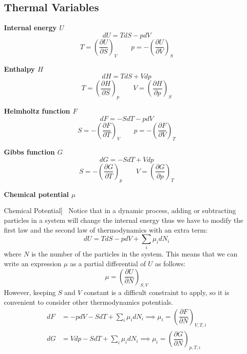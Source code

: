 \documentclass[UTF8]{book}
\newenvironment{theorem}[2][Theorem]{\begin{trivlist}
\item[\hskip \labelsep {\bfseries #1}\hskip \labelsep {\bfseries }]}{\end{trivlist}}
\begin{document}
\subsection{Thermal Variables}
\begin{itemize}
\item \textbf{Internal energy $U$}
$$dU=TdS-pdV$$
$$T=\left(\dfrac{\partial U}{\partial S}\right)_V \qquad p=-\left(\dfrac{\partial U}{\partial V}\right)_S$$
\item \textbf{Enthalpy $H$} \cite{schroeder1999introduction}
$$dH=TdS+Vdp$$
$$T=\left(\dfrac{\partial H}{\partial S}\right)_p \qquad V=\left(\dfrac{\partial H}{\partial p}\right)_S$$
\item \textbf{Helmholtz function $F$}
$$dF=-SdT-pdV$$
$$S=-\left(\dfrac{\partial F}{\partial T}\right)_V \qquad p=-\left(\dfrac{\partial F}{\partial V}\right)_T$$
\item \textbf{Gibbs function $G$}
$$dG=-SdT+Vdp$$
$$S=-\left(\dfrac{\partial G}{\partial T}\right)_p \qquad V=\left(\dfrac{\partial G}{\partial p}\right)_T$$
\item \textbf{Chemical potential $\mu$}

\begin{theorem}
[Chemical Potential]~  {Notice that in a dynamic process, adding or subtracting particles in a system will change the internal energy thus we have to modify the first law and the second law of thermodynamics with an extra term:}
$$dU=TdS-pdV+\sum_i\mu _idN_i$$
 {where $N$ is the number of the particles in the system. This means that we can write an expression $\mu $ as a partial differential of $U$ as follows:}
$$\mu =\left(\dfrac{\partial U}{\partial N}\right)_{S,V}$$
 {However, keeping $S$ and $V$ constant is a difficult constraint to apply, so it is convenient to consider other thermodynamics potentials.}
\begin{align*}
dF&=-pdV-SdT+\sum_i\mu _idN_i \implies \mu _i =\left(\dfrac{\partial F}{\partial N}\right)_{V,T,i}\\
dG&=Vdp-SdT+\sum_i\mu _idN_i \implies \mu _i =\left(\dfrac{\partial G}{\partial N}\right)_{p,T,i}
\end{align*}
\end{theorem}
\end{itemize}
\end{document}
